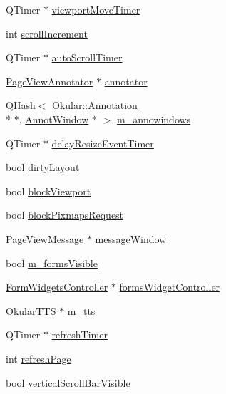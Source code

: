 \begin{DoxyCompactItemize}
Q\+Timer $\ast$ \hyperlink{classPageViewPrivate_aa64146b7eacddc342bbdded26dc08c6a}{viewport\+Move\+Timer}
\item 
int \hyperlink{classPageViewPrivate_a514156a25a5fc564a7ddabe5d30bcecb}{scroll\+Increment}
\item 
Q\+Timer $\ast$ \hyperlink{classPageViewPrivate_afe16a683945c2e7edf9906eb30ad6d8b}{auto\+Scroll\+Timer}
\item 
\hyperlink{classPageViewAnnotator}{Page\+View\+Annotator} $\ast$ \hyperlink{classPageViewPrivate_a07bad73b61f6b400411aacc7e2e820a0}{annotator}
\item 
Q\+Hash$<$ \hyperlink{classOkular_1_1Annotation}{Okular\+::\+Annotation} \\*
$\ast$, \hyperlink{classAnnotWindow}{Annot\+Window} $\ast$ $>$ \hyperlink{classPageViewPrivate_adb8fb9cfc6f045acbbe4cb534003adb2}{m\+\_\+annowindows}
\item 
Q\+Timer $\ast$ \hyperlink{classPageViewPrivate_a65c32086d23fd9e7fa3bd4256e7f2788}{delay\+Resize\+Event\+Timer}
\item 
bool \hyperlink{classPageViewPrivate_a2acaf067a43d2fae544738ceac1f7ed6}{dirty\+Layout}
\item 
bool \hyperlink{classPageViewPrivate_a3d7de95f519e1c4e836d7b5876b2042b}{block\+Viewport}
\item 
bool \hyperlink{classPageViewPrivate_ac565de32d210643820d0c2d405e8f360}{block\+Pixmaps\+Request}
\item 
\hyperlink{classPageViewMessage}{Page\+View\+Message} $\ast$ \hyperlink{classPageViewPrivate_aa836af37149ea9fbfefd8de357c9194b}{message\+Window}
\item 
bool \hyperlink{classPageViewPrivate_ab9f225d7d34deb0a414ded10ab49a4dc}{m\+\_\+forms\+Visible}
\item 
\hyperlink{classFormWidgetsController}{Form\+Widgets\+Controller} $\ast$ \hyperlink{classPageViewPrivate_a0b24eb01788092e1699d8380c88fb295}{forms\+Widget\+Controller}
\item 
\hyperlink{classOkularTTS}{Okular\+T\+T\+S} $\ast$ \hyperlink{classPageViewPrivate_a85874d387cff75a0c9b07e698942483d}{m\+\_\+tts}
\item 
Q\+Timer $\ast$ \hyperlink{classPageViewPrivate_a1bfeacfe84200c82984784fb057eee64}{refresh\+Timer}
\item 
int \hyperlink{classPageViewPrivate_a840db896fe007ae5df6cfa907cba6409}{refresh\+Page}
\item 
bool \hyperlink{classPageViewPrivate_ae6defa78192680c6f0943b1d2b2aafa8}{vertical\+Scroll\+Bar\+Visible}

\end{DoxyCompactItemize}
